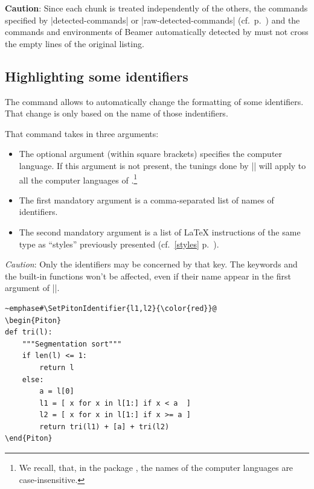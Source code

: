 \documentclass{article}
\begin{document}
\bigskip
\textbf{Caution}: Since each chunk is treated independently of the others, the
commands specified by |detected-commands| or |raw-detected-commands|
(cf.~p.~\pageref{detected-commands}) and the commands and environments of
Beamer automatically detected by  must not cross the empty lines of
the original listing.

\subsection{Highlighting some identifiers}

\label{SetPitonIdentifier}

The command  allows to automatically
change the formatting of some identifiers. That change is only based on the
name of those indentifiers.

\smallskip
That command takes in three arguments: 

\begin{itemize}
\item The optional argument (within square brackets) specifies the computer
language. If this argument is not present, the tunings done by
|\SetPitonIdentifier| will apply to all the computer languages of
.\footnote{We recall, that, in the package , the
names of the computer languages are case-insensitive.}

\item The first mandatory argument is a comma-separated list of names of
identifiers.

\item The second mandatory argument is a list of LaTeX instructions of the
same type as  ``styles'' previously presented (cf.~\ref{styles}
p.~\pageref{styles}). 
\end{itemize}

\emph{Caution}: Only the identifiers may be concerned by that key. The
keywords and the built-in functions won't be affected, even if their name
appear in the first argument of |\SetPitonIdentifier|.

\begin{Verbatim}
~emphase#\SetPitonIdentifier{l1,l2}{\color{red}}@
\begin{Piton}
def tri(l):
    """Segmentation sort"""
    if len(l) <= 1:
        return l
    else:
        a = l[0]
        l1 = [ x for x in l[1:] if x < a  ]
        l2 = [ x for x in l[1:] if x >= a ]
        return tri(l1) + [a] + tri(l2)
\end{Piton}
\end{Verbatim}
\end{document}
